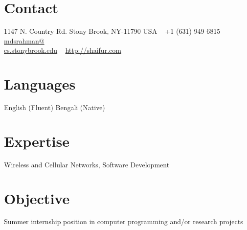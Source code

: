 \documentclass[]{friggeri-cv} %
\begin{document}
      
    
         
\begin{aside} %
\section{Contact}
1147 N. Country Rd.
Stony Brook, NY-11790
USA 
~
+1 (631) 949 6815
~
\href{mailto:mdsrahman@cs.stonybrook.edu}{mdsrahman@\\cs.stonybrook.edu}
~
\href{http://shaifur.com}{http://shaifur.com}
~
\section{Languages}
English (Fluent)
Bengali (Native)
~
\section{Expertise}
Wireless and Cellular Networks,
Software Development
\end{aside}

\section{Objective} 
Summer internship position in computer programming and/or research projects
\end{document}
